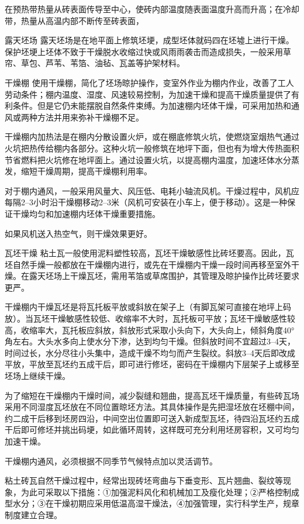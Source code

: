 \documentclass{ctexbook}
\begin{document}
在预热带热量从砖表面传导至中心，使砖内部温度随表面温度升高而升高；在冷却带，热量从高温内部不断传至砖表面，

露天坯场 露天坯场是在地平面上修筑坯埂，成型坯体就码四在坯墟上进行干燥。保护坯埂上坯体不致于干燥脱水收缩过快或风雨雨袭击而造成损失，一般采用草帘、草包、芦苇、苇箔、油毡、瓦盖等护架材料。

干燥棚 使用干燥棚，简化了坯场晾护操作，变室外作业为棚内作业，改善了工人劳动条件；棚内温度、湿度、风速较易控制，为加速干燥和提高干燥质量提供了有利条件。但是它仍未能摆脱自然条件束缚。为加速棚内坯体干燥，可采用加热和通风或两种方法并用来弥补干燥棚不足。

干燥棚内加热法是在棚内分散设置火炉，或在棚底修筑火坑，使燃烧室烟热气通过火坑把热传给棚内各部分。这种火坑一般修筑在地坪下面，但也有为增大传热面积节省燃料把火坑修在地坪面上。通过设置火坑，以提高棚内温度，加速坯体水分蒸发，缩短干燥周期，提高干燥棚利用率。

对于棚内通风，一般采用风量大、风压低、电耗小轴流风机。干燥过程中，风机应每隔2--3小时沿干燥棚移动2--3米（风机可安装在小车上，便于移动）。这是一种保证干燥均匀和加速棚内坯体干燥重要措施。

如果风机送入热空气，则干燥效果更好。

瓦坯干燥 粘土瓦一般使用泥料塑性较高，瓦坯干燥敏感性比砖坯要高。因此，瓦坯自然手燥一般都放在干燥棚内进行，或先在干燥棚内干燥一段时间再移至室外干燥。在露天坯场上干燥瓦坯，需用苇箔或草席围护，其管理及晾护操作比砖坯要求更严。

干燥棚内干燥瓦坯是将瓦托板平放或斜放在架子上（有脚瓦架可直接在地坪上码放）。当瓦坯干燥敏感性较低、收缩率不大时，瓦托板可平放；瓦坯干燥敏感性较高，收缩率大，瓦托板应斜放，斜放形式采取小头向下，大头向上，倾斜角度40°角左右。大头水多向上使水分下渗，达到均匀干燥。但斜放时间不宜超过3--4天，时间过长，水分尽往小头集中，造成干燥不均匀而产生裂纹。斜放3--4天后即改成平放，平放至瓦坯约五成干后，即可进行修坯，密码在干燥棚内下层架子上或移至坯场上继续干燥。

为了缩短在干燥棚内干燥时间，减少裂缝和翘曲，提高瓦坯干燥质量，有些砖瓦场采用不同湿度瓦坯放在不同位置晾坯方法。其具体操作是先把湿坯放在坯棚中间，约二成干后移到坯房四沿，中间空出位置即可送入新成型瓦坯，待四沿瓦坯约五成干后即可修坯并挑出码埂，如此循环周转，这样既可充分利用坯房容积，又可均匀加速干燥。

干燥棚内通风，必须根据不同季节气候特点加以灵活调节。

粘土砖瓦自然干燥过程中，经常出现砖坯弯曲与下垂变形、瓦片翘曲、裂纹等现象，为此可采取以下措施：①加强泥料风化和机械加工及瘦化处理；②严格控制成型水分；③在干燥初期应采用低温高湿干燥法，④加强管理，实行科学生产，规章制度建立合理。
\end{document}
